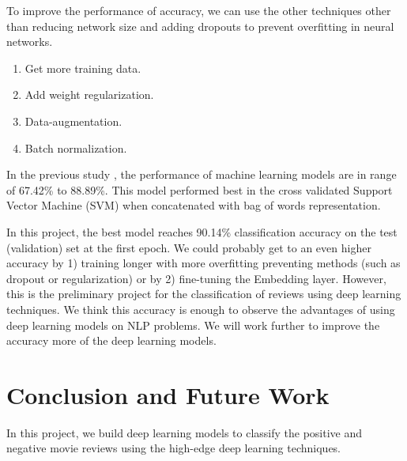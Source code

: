 \documentclass[11pt]{article}
\begin{document}
To improve the performance of accuracy, we can use the other techniques other than
reducing network size and adding dropouts 
to prevent overfitting in neural networks.
\begin{enumerate}
\setlength\itemsep{-1em}
\item Get more training data.
\item Add weight regularization.
\item Data-augmentation.
\item Batch normalization.
\end{enumerate}

%
In the previous study \cite{Stanford_movie_review_paper}, the performance of machine learning models are in range of 67.42\% to 88.89\%. 
This model performed best in the cross validated Support Vector Machine (SVM) when concatenated with bag of words representation. 

%
In this project, the best model reaches 90.14\% classification accuracy on the test (validation) set at the first epoch. 
We could probably get to an even higher accuracy 
by 1) training longer with more overfitting preventing methods (such as dropout or regularization) or 
by 2) fine-tuning the Embedding layer.
%
However, this is the preliminary project for the classification of reviews using deep learning techniques.
We think this accuracy is enough to observe the advantages of using deep learning models on NLP problems. 
%
We will work further to improve the accuracy more of the deep learning models.

\section{Conclusion and Future Work}


In this project, we build deep learning models to classify the positive and negative movie reviews using the high-edge deep learning techniques. 
\end{document}
